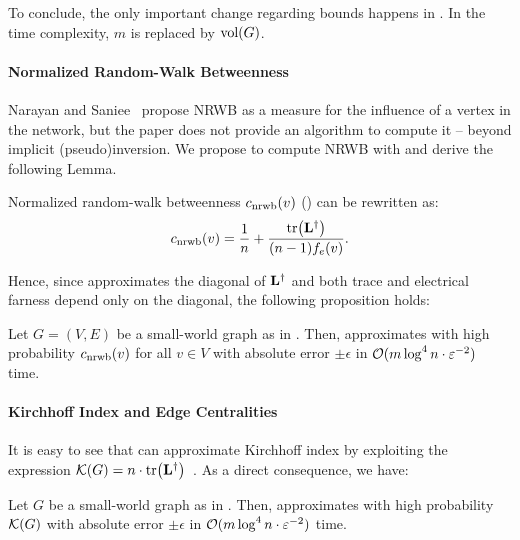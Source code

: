 To conclude, the only important change regarding bounds happens in .
In the time complexity, $m$ is replaced by $\text{vol}(G)$.

\paragraph{Normalized Random-Walk Betweenness}
Narayan and Saniee~\cite{DBLP:conf/complexnetworks/NarayanS18} propose NRWB as a measure for
the influence of a vertex in the network, but the paper does not provide an algorithm to compute
it -- beyond implicit (pseudo)inversion.
We propose to compute NRWB with  and derive the following Lemma.

\begin{lemma}
\label{lemma:el-clos:simpler-nrwb}
Normalized random-walk betweenness $c_{\text{nrwb}}(v)$ () can be rewritten as:
%
\[
\nrwb(v) = \frac{1}{n} + \frac{\tr{\Linv}}{(n - 1)\elfarn(v)}.
\]
\end{lemma}

Hence, since  approximates the diagonal of $\mathbf{L}^\dagger$ and both trace
and electrical farness depend only on the diagonal, the following proposition holds:

\begin{proposition}
Let $G = (V, E)$ be a small-world graph as in . Then,
 approximates with high probability $c_{\text{nrwb}}(v)$ for all $v\in V$
with absolute error $\pm\epsilon$ in $\mathcal{O}(m\log^4 n \cdot \varepsilon^{-2})$ time.
\end{proposition}

\paragraph{Kirchhoff Index and Edge Centralities}
It is easy to see that  can approximate Kirchhoff index by
exploiting the expression $\kidx(G) = n\cdot\tr{\Linv}$~\cite{klein1993resistance}.
As a direct consequence, we have:

\begin{proposition}
Let $G$ be a small-world graph as in . Then, 
approximates with high probability $\mathcal{K}(G)$ with absolute error $\pm\epsilon$ in
$\mathcal{O}(m\log^4n\cdot\varepsilon^{-2})$ time.
\end{proposition}

